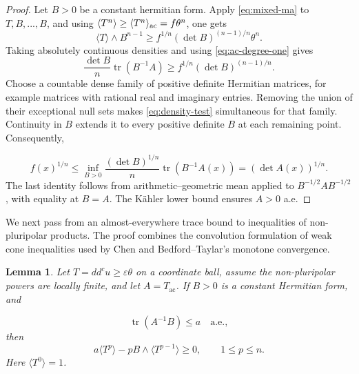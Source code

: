 \documentclass[reqno]{amsart}
\numberwithin{equation}{section}
\newtheorem{lemma}[theorem]{Lemma}
\theoremstyle{definition}
\DeclareMathOperator{\tr}{tr}
\begin{document}
\begin{proof}
    Let $B>0$ be a constant hermitian form. Apply \eqref{eq:mixed-ma} to $T,B,...,B$, and using $\langle T^n\rangle\geq\langle T^n\rangle_{\rm ac}=f\theta^n$, one gets \[
    \langle T\rangle\wedge B^{n-1}\geq f^{1/n}(\det B)^{(n-1)/n}\theta^n.
    \]
    Taking absolutely continuous densities and using \eqref{eq:ac-degree-one} gives \begin{equation}
        \label{eq:density-test}
\frac{\det B}{n}\tr(B^{-1}A)
\geq f^{1/n}(\det B)^{(n-1)/n}.
    \end{equation}
    Choose a countable dense family of positive definite Hermitian matrices, for example matrices with rational real and imaginary entries. Removing the union of their exceptional null sets makes \eqref{eq:density-test} simultaneous for that family. Continuity in $B$ extends it to every positive definite $B$ at each remaining point. Consequently,

\[
f(x)^{1/n}
\leq\inf_{B>0}\frac{(\det B)^{1/n}}n\tr(B^{-1}A(x))
=(\det A(x))^{1/n}.
\]
The last identity follows from arithmetic--geometric mean applied to $B^{-1/2}AB^{-1/2}$, with equality at $B=A$. The K\"ahler lower bound ensures $A>0$ a.e.
\end{proof}

We next pass from an almost-everywhere trace bound to inequalities
of non-pluripolar products. The proof combines the convolution
formulation of weak cone inequalities used by Chen
\cite[Definition~3.3]{C21} and Bedford--Taylar's monotone convergence. 
\begin{lemma}\label{lem:np-cone}
    Let $T=dd^cu\geq\varepsilon\theta$ on a coordinate ball, assume the non-pluripolar powers are locally finite, and let $A=T_{\mathrm{ac}}$. If $B>0$ is a constant Hermitian form, and

\[
\tr(A^{-1}B)\leq a\quad\text{a.e.},
\]
then
\begin{equation}\label{eq:np-cone}
a\langle T^p\rangle-pB\wedge\langle T^{p-1}\rangle\geq0,
\qquad 1\leq p\leq n.
\end{equation}
Here $\langle T^0\rangle=1$.
\end{lemma}
\end{document}
